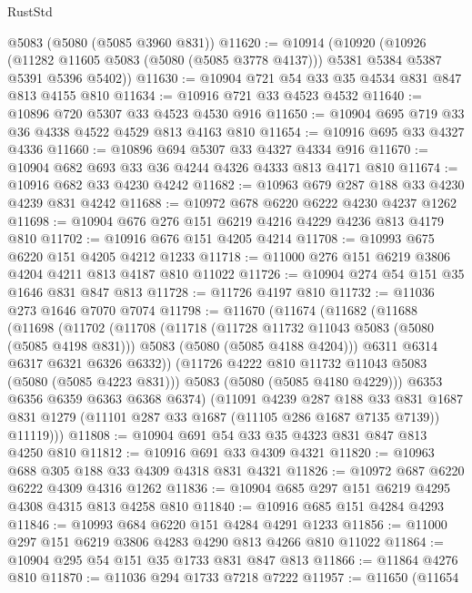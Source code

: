 \begin{lexlean}{RustStd}
\begin{coremodule}
    @5083
    (@5080 (@5085 @3960 @831))
@11620 := @10914
    (@10920
      (@10926
        (@11282 @11605 @5083 (@5080 (@5085 @3778 @4137)))
        @5381
        @5384
        @5387
        @5391
        @5396
        @5402))
@11630 := @10904 @721 @54 @33 @35 @4534 @831 @847 @813 @4155 @810
@11634 := @10916 @721 @33 @4523 @4532
@11640 := @10896 @720 @5307 @33 @4523 @4530 @916
@11650 := @10904 @695 @719 @33 @36 @4338 @4522 @4529 @813 @4163 @810
@11654 := @10916 @695 @33 @4327 @4336
@11660 := @10896 @694 @5307 @33 @4327 @4334 @916
@11670 := @10904 @682 @693 @33 @36 @4244 @4326 @4333 @813 @4171 @810
@11674 := @10916 @682 @33 @4230 @4242
@11682 := @10963 @679 @287 @188 @33 @4230 @4239 @831 @4242
@11688 := @10972 @678 @6220 @6222 @4230 @4237 @1262
@11698 := @10904 @676 @276 @151 @6219 @4216 @4229 @4236 @813 @4179 @810
@11702 := @10916 @676 @151 @4205 @4214
@11708 := @10993 @675 @6220 @151 @4205 @4212 @1233
@11718 := @11000 @276 @151 @6219 @3806 @4204 @4211 @813 @4187 @810 @11022
@11726 := @10904 @274 @54 @151 @35 @1646 @831 @847 @813
@11728 := @11726 @4197 @810
@11732 := @11036 @273 @1646 @7070 @7074
@11798 := @11670
    (@11674
      (@11682
        (@11688
          (@11698
            (@11702
              (@11708
                (@11718
                  (@11728 @11732 @11043 @5083 (@5080 (@5085 @4198 @831)))
                  @5083
                  (@5080 (@5085 @4188 @4204)))
                @6311
                @6314
                @6317
                @6321
                @6326
                @6332))
            (@11726 @4222 @810 @11732 @11043 @5083 (@5080 (@5085 @4223 @831)))
            @5083
            (@5080 (@5085 @4180 @4229)))
          @6353
          @6356
          @6359
          @6363
          @6368
          @6374)
        (@11091
          @4239
          @287
          @188
          @33
          @831
          @1687
          @831
          @1279
          (@11101 @287 @33 @1687 (@11105 @286 @1687 @7135 @7139))
          @11119)))
@11808 := @10904 @691 @54 @33 @35 @4323 @831 @847 @813 @4250 @810
@11812 := @10916 @691 @33 @4309 @4321
@11820 := @10963 @688 @305 @188 @33 @4309 @4318 @831 @4321
@11826 := @10972 @687 @6220 @6222 @4309 @4316 @1262
@11836 := @10904 @685 @297 @151 @6219 @4295 @4308 @4315 @813 @4258 @810
@11840 := @10916 @685 @151 @4284 @4293
@11846 := @10993 @684 @6220 @151 @4284 @4291 @1233
@11856 := @11000 @297 @151 @6219 @3806 @4283 @4290 @813 @4266 @810 @11022
@11864 := @10904 @295 @54 @151 @35 @1733 @831 @847 @813
@11866 := @11864 @4276 @810
@11870 := @11036 @294 @1733 @7218 @7222
@11957 := @11650
    (@11654

\end{coremodule}
\end{lexlean}
